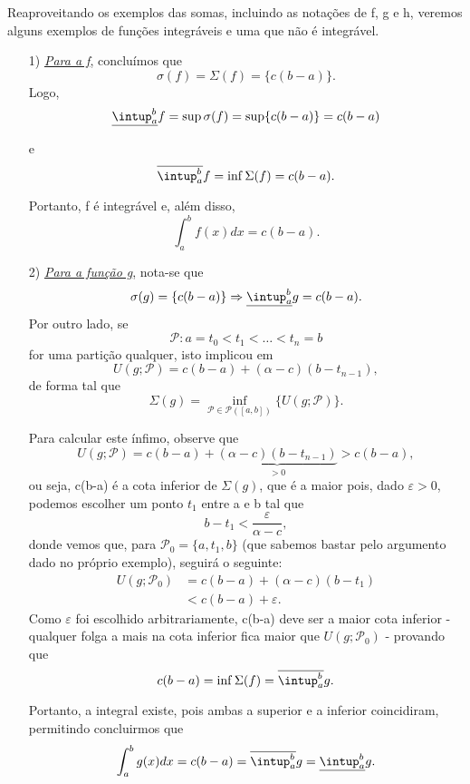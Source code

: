 \documentclass[../analysisII_notes.tex]{subfiles}
\begin{document}
Reaproveitando os exemplos das somas, incluindo as notações de f, g e h, veremos alguns exemplos de funções integráveis e uma que não é integrável.
\begin{example}
	\begin{itemize}
		\item[1)] \hyperlink{fexample}{\textit{Para a f}}, concluímos que
		      \[
			      \sigma (f) = \Sigma (f) = \{c(b-a)\}.
		      \]
		      Logo,
		      \[
			      \underline{\intup_{a}^{b}}f = \sup_{}\sigma (f) = \sup_{}\{c(b-a)\} = c(b-a)
		      \]
		      e
		      \[
			      \overline{\intup_{a}^{b}}f = \inf_{}\Sigma (f) = c(b-a).
		      \]
		      Portanto, f é integrável e, além disso,
		      \[
			      \int_{a}^{b}f(x)dx = c(b-a).
		      \]
		\item[2)] \hyperlink{gexample}{\textit{Para a função g}}, nota-se que
		      \[
			      \sigma (g) = \{c(b-a)\} \Rightarrow \underline{\intup_{a}^{b}}g = c(b-a).
		      \]
		      Por outro lado, se
		      \[
			      \mathcal{P}:a = t_{0} < t_{1} < \dotsc < t_{n} = b
		      \]
		      for uma partição qualquer, isto implicou em
		      \[
			      U(g; \mathcal{P}) = c(b-a) + (\alpha -c)(b-t_{n-1}),
		      \]
		      de forma tal que
		      \[
			      \Sigma (g) = \inf_{\mathcal{P}\in \mathcal{P}([a, b])}\{U(g; \mathcal{P})\}.
		      \]

		      Para calcular este ínfimo, observe que
		      \[
			      U(g; \mathcal{P}) = c(b-a) + \underbrace{(\alpha -c)(b-t_{n-1})}_{>0} > c(b-a),
		      \]
		      ou seja, c(b-a) é a cota inferior de \(\Sigma (g)\), que é a maior pois, dado \(\varepsilon > 0\), podemos escolher um ponto \(t_{1}\) entre a e b tal que
		      \[
			      b-t_{1} < \frac{\varepsilon }{\alpha - c},
		      \]
		      donde vemos que, para \(\mathcal{P}_{0} = \{a, t_{1}, b\}\) (que sabemos bastar pelo argumento dado no próprio exemplo), seguirá o seguinte:
		      \begin{align*}
			      U(g; \mathcal{P}_{0}) & = c(b-a) + (\alpha -c)(b-t_{1}) \\
			                            & < c(b-a) + \varepsilon.
		      \end{align*}
		      Como \(\varepsilon \) foi escolhido arbitrariamente, c(b-a) deve ser a maior cota inferior - qualquer folga a mais na cota inferior fica maior que \(U(g; \mathcal{P}_{0})\) - provando que
		      \[
			      c(b-a) = \inf_{}\Sigma (f) = \overline{\intup_{a}^{b}}g.
		      \]
		      Portanto, a integral existe, pois ambas a superior e a inferior coincidiram, permitindo concluirmos que
		      \[
			      \int_{a}^{b}g(x)dx = c(b-a) = \overline{\intup_{a}^{b}}g = \underline{\intup_{a}^{b}}g.
		      \]


\end{itemize}
\end{example}
\end{document}
